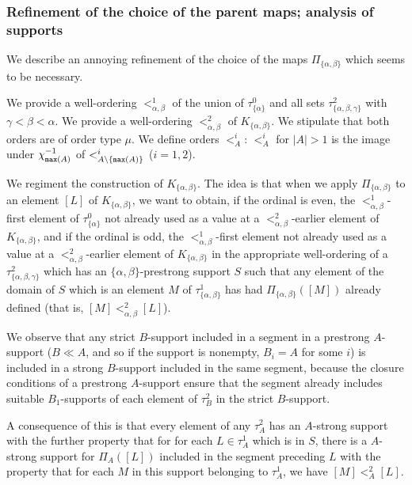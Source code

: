 \documentclass[12pt]{article}
\begin{document}
\newpage

\subsubsection{Refinement of the choice of the parent maps; analysis of supports}

We describe an annoying refinement of the choice of the maps $\Pi_{\{\alpha,\beta\}}$ which seems to be necessary.

We provide a well-ordering $<^1_{\alpha,\beta}$ of the union of $\tau^0_{\{\alpha\}}$ and all sets $\tau^2_{\{\alpha,\beta,\gamma\}}$ with $\gamma<\beta<\alpha$.  We provide a well-ordering $<^2_{\alpha,\beta}$ of $K_{\{\alpha,\beta\}}$.  We stipulate that both orders are of order type $\mu$.  We define orders $<^i_A$:  $<^i_A$ for $|A|>1$ is the image under $\chi_{{\tt max}(A)}^{-1}$ of $<^i_{A \setminus \{{\tt max}(A)\}}$ ($i=1,2$).

We regiment the construction of $K_{\{\alpha,\beta\}}$.  The idea is that when we apply $\Pi_{\{\alpha,\beta\}}$ to an  element $[L]$ of $K_{\{\alpha,\beta\}}$, we want to obtain, if the ordinal is even, the $<^1_{\alpha,\beta}$-first element of $\tau^0_{\{\alpha\}}$ not already used as a value at  a $<^2_{\alpha,\beta}$-earlier element of $K_{\{\alpha,\beta\}}$, and if the ordinal is odd,
the $<^1_{\alpha,\beta}$-first element not already used as a value at  a $<^2_{\alpha,\beta}$-earlier element of $K_{\{\alpha,\beta\}}$ in the appropriate well-ordering of a $\tau^2_{\{\alpha,\beta,\gamma\}}$ which has an $\{\alpha,\beta\}$-prestrong support $S$ such that any element of the domain of $S$ which is an element $M$ of $\tau^1_{\{\alpha,\beta\}}$ 
has had $\Pi_{\{\alpha,\beta\}}([M])$ already defined (that is, $[M] <^2_{\alpha,\beta} [L]$).

We observe that any strict $B$-support included in a segment in a prestrong $A$-support ($B \ll A$, and so if the support is nonempty, $B_i=A$ for some $i$) is included in a strong $B$-support included in the same segment, because the closure conditions of
a prestrong $A$-support ensure that the segment already includes suitable $B_1$-supports of each element of $\tau^2_B$ in the strict $B$-support.

A consequence of this is that every element of any $\tau^2_A$ has an $A$-strong support with the further property that for for each $L \in \tau^1_A$ which is in $S$,
there is a $A$-strong support for $\Pi_A([L])$ included in the segment  preceding $L$ with the property that for each $M$ in this support belonging to $\tau^1_A$, we have $[M]<^2_A[L]$.
\end{document}
